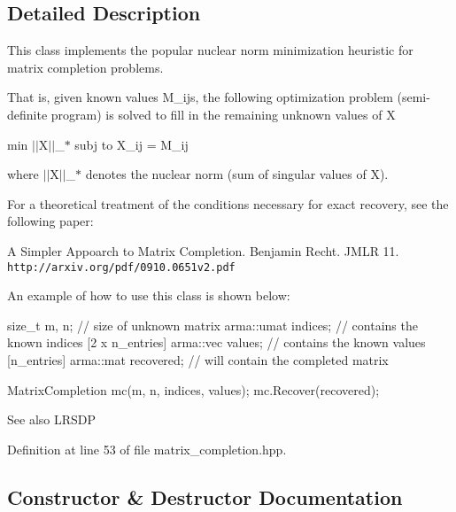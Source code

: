 \subsection{Detailed Description}
This class implements the popular nuclear norm minimization heuristic for matrix completion problems. 

That is, given known values M\+\_\+ij\textquotesingle{}s, the following optimization problem (semi-\/definite program) is solved to fill in the remaining unknown values of X

min $\vert$$\vert$\+X$\vert$$\vert$\+\_\+$\ast$ subj to X\+\_\+ij = M\+\_\+ij

where $\vert$$\vert$\+X$\vert$$\vert$\+\_\+$\ast$ denotes the nuclear norm (sum of singular values of X).

For a theoretical treatment of the conditions necessary for exact recovery, see the following paper\+:

A Simpler Appoarch to Matrix Completion. Benjamin Recht. J\+M\+LR 11. {\tt http\+://arxiv.\+org/pdf/0910.\+0651v2.\+pdf}

An example of how to use this class is shown below\+:


\begin{DoxyCode}
\textcolor{keywordtype}{size\_t} m, n;         \textcolor{comment}{// size of unknown matrix}
arma::umat indices;  \textcolor{comment}{// contains the known indices [2 x n\_entries]}
arma::vec values;    \textcolor{comment}{// contains the known values [n\_entries]}
arma::mat recovered; \textcolor{comment}{// will contain the completed matrix}

MatrixCompletion mc(m, n, indices, values);
mc.Recover(recovered);
\end{DoxyCode}


\begin{DoxySeeAlso}{See also}
L\+R\+S\+DP 
\end{DoxySeeAlso}


Definition at line 53 of file matrix\+\_\+completion.\+hpp.



\subsection{Constructor \& Destructor Documentation}
\mbox{\label{classmlpack_1_1matrix__completion_1_1MatrixCompletion_a5f500c0e84f8afe5603571983f88339b}} 
